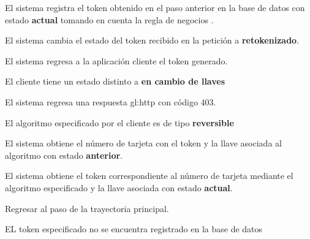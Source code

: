 {\begin{trayectoriaPrincipal}
    \item El sistema registra el token obtenido en el paso anterior en la base
      de datos con estado \textbf{actual} tomando en cuenta la regla de negocios
      .

    \item El sistema cambia el estado del token recibido en la petición
      a \textbf{retokenizado}.

    \item [regreso_token] El sistema regresa a la aplicación cliente el token
      generado.

  \end{trayectoriaPrincipal}


  \begin{trayectoriaAlternativa}
    {El cliente tiene un estado distinto a \textbf{en cambio de llaves}}

    \item El sistema regresa una respuesta \gls{gl:http} con código 403.

  \end{trayectoriaAlternativa}


  \begin{trayectoriaAlternativa}
    {El algoritmo especificado por el cliente es de tipo \textbf{reversible}}

    \item El sistema obtiene el número de tarjeta con el token y la llave
      asociada al algoritmo con estado \textbf{anterior}.

    \item El sistema obtiene el token correspondiente al número de tarjeta
      mediante el algoritmo especificado y la llave asociada con estado
      \textbf{actual}.

    \item Regresar al paso  de la trayectoria
      principal.

  \end{trayectoriaAlternativa}


  \begin{trayectoriaAlternativa}
    {EL token especificado no se encuentra registrado en la base de datos}


\end{trayectoriaAlternativa}}
